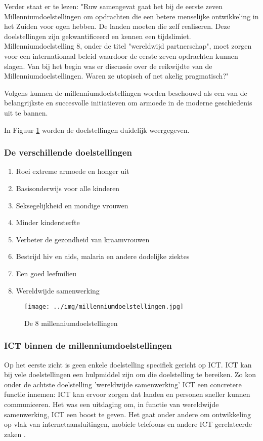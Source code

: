 Verder staat er te lezen: "Ruw samengevat gaat het bij de eerste zeven Millenniumdoelstellingen om opdrachten die een betere menselijke ontwikkeling in het Zuiden voor ogen hebben. De landen moeten die zelf realiseren. Deze doelstellingen zijn gekwantificeerd en kennen een tijdslimiet. Millenniumdoelstelling 8, onder de titel "wereldwijd partnerschap", moet zorgen voor een internationaal beleid waardoor de eerste zeven opdrachten kunnen slagen. Van bij het begin was er discussie over de reikwijdte van de Millenniumdoelstellingen. Waren ze utopisch of net akelig pragmatisch?" \autocite{11.11.112019}

Volgens \autocite{Tjoa2016} kunnen de millenniumdoelstellingen worden beschouwd als een van de belangrijkste en succesvolle initiatieven om armoede in de moderne geschiedenis uit te bannen.

In Figuur \ref{milleniumdoelstellingen} worden de doelstellingen duidelijk weergegeven.

 
 \subsubsection{De verschillende doelstellingen}
 \begin{enumerate}
 \item Roei extreme armoede en honger uit
 \item Basisonderwijs voor alle kinderen
 \item Seksegelijkheid en mondige vrouwen
 \item Minder kindersterfte
 \item Verbeter de gezondheid van kraamvrouwen
 \item Bestrijd hiv en aids, malaria en andere dodelijke ziektes
 \item Een goed leefmilieu 
 \item Wereldwijde samenwerking
\end{enumerate}
\autocite{NOS2015}

\begin{figure}[h!]
	\texttt{[image: ../img/millenniumdoelstellingen.jpg]}
	\caption{De 8 millenniumdoelstellingen \autocite{NOS2015}}
	\label{milleniumdoelstellingen}
\end{figure}

 \subsubsection{ICT binnen de millenniumdoelstellingen}
 Op het eerste zicht is geen enkele doelstelling specifiek gericht op ICT. ICT kan bij vele doelstellingen een hulpmiddel zijn om die doelstelling te bereiken. Zo kon onder de achtste doelstelling 'wereldwijde samenwerking' ICT een concretere functie innemen: ICT kan ervoor zorgen dat landen en personen sneller kunnen communiceren. Het was een uitdaging om, in functie van wereldwijde samenwerking, ICT een boost te geven. Het gaat onder andere om ontwikkeling op vlak van internetaansluitingen, mobiele telefoons en andere ICT gerelateerde zaken \autocite{NOS2015}.
 
